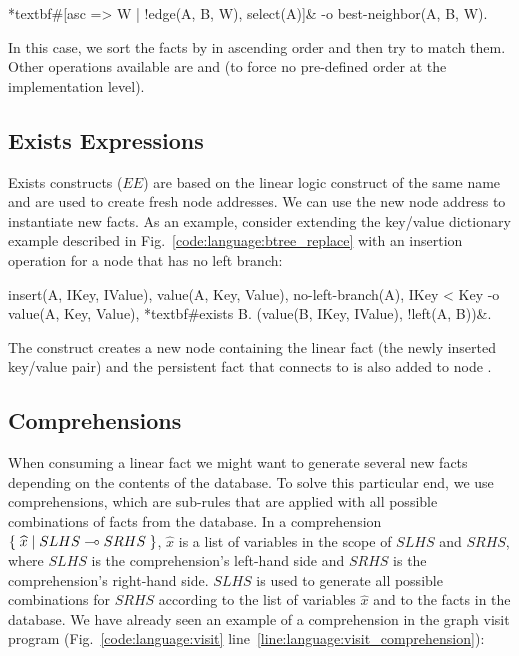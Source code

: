 \begin{Code}[commandchars=\*\#\&]
*textbf#[asc => W | !edge(A, B, W), select(A)]& -o best-neighbor(A, B, W).
\end{Code}

In this case, we sort the  facts by  in ascending order
and then try to match them. Other operations available are  and
 (to force no pre-defined order at the implementation level).

\subsection{Exists Expressions}\label{section:language:expressions}

Exists constructs ($EE$) are based on the linear logic construct of the same
name and are used to create fresh node addresses. We can use the new node address to
instantiate new facts. As an example, consider extending the
key/value dictionary example described in Fig.~\ref{code:language:btree_replace}
with an insertion operation for a node that has no left branch:

\begin{Code}[commandchars=\*\#\&]
insert(A, IKey, IValue),
value(A, Key, Value),
no-left-branch(A),
IKey < Key
   -o value(A, Key, Value),
      *textbf#exists B. (value(B, IKey, IValue), !left(A, B))&.
\end{Code}

The  construct creates a new node  containing the linear fact
 (the newly inserted key/value pair) and the
persistent fact  that connects  to  is also
added to node .

\subsection{Comprehensions}

When consuming a linear fact we might want to generate several new
facts depending on the contents of the database. To solve this particular end,
we use comprehensions, which are sub-rules that are applied with all possible
combinations of facts from the database. In a comprehension
$\{ \; \widehat{x} \; | \; SLHS \multimap SRHS \; \}$, $\widehat{x}$ is a list of variables
in the scope of $SLHS$ and $SRHS$, where $SLHS$ is the comprehension's left-hand
side and $SRHS$ is the comprehension's right-hand side. $SLHS$ is used to generate
all possible combinations for $SRHS$ according to the list of variables
$\hat{x}$ and to the facts in the database. We have already seen an example of a
comprehension in the graph visit program (Fig.~\ref{code:language:visit}
line~\ref{line:language:visit_comprehension}):

